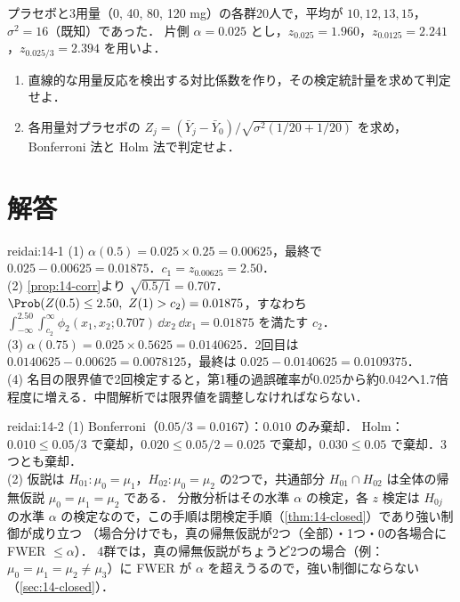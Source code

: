 \begin{reidai}[対比と多重性]\label{reidai:14-3}
プラセボと3用量（0, 40, 80, 120 mg）の各群20人で，平均が $10,12,13,15$，$\sigma^2=16$（既知）であった．
片側 $\alpha=0.025$ とし，$z_{0.025}=1.960$，$z_{0.0125}=2.241$，$z_{0.025/3}=2.394$ を用いよ．
\begin{enumerate}[label=(\arabic*)]
\item 直線的な用量反応を検出する対比係数を作り，その検定統計量を求めて判定せよ．
\item 各用量対プラセボの $Z_j=(\bar Y_j-\bar Y_0)/\sqrt{\sigma^2(1/20+1/20)}$ を求め，Bonferroni 法と Holm 法で判定せよ．
\end{enumerate}
\end{reidai}

\section{解答}\label{sec:14-sol}
\begin{kaitou}{reidai:14-1}
(1) $\alpha(0.5)=0.025\times0.25=0.00625$，最終で $0.025-0.00625=0.01875$．$c_1=z_{0.00625}=2.50$．\\
(2) \cref{prop:14-corr}より $\sqrt{0.5/1}=0.707$．$\Prob(Z(0.5)\le2.50,\ Z(1)>c_2)=0.01875$，すなわち
$\int_{-\infty}^{2.50}\int_{c_2}^{\infty}\phi_2(x_1,x_2;0.707)\,\dd x_2\,\dd x_1=0.01875$ を満たす $c_2$．\\
(3) $\alpha(0.75)=0.025\times0.5625=0.0140625$．2回目は $0.0140625-0.00625=0.0078125$，最終は $0.025-0.0140625=0.0109375$．\\
(4) 名目の限界値で2回検定すると，第1種の過誤確率が0.025から約0.042へ1.7倍程度に増える．中間解析では限界値を調整しなければならない．
\end{kaitou}

\begin{kaitou}{reidai:14-2}
(1) Bonferroni（$0.05/3=0.0167$）：$0.010$ のみ棄却．
Holm：$0.010\le0.05/3$ で棄却，$0.020\le0.05/2=0.025$ で棄却，$0.030\le0.05$ で棄却．3つとも棄却．\\
(2) 仮説は $H_{01}:\mu_0=\mu_1$，$H_{02}:\mu_0=\mu_2$ の2つで，共通部分 $H_{01}\cap H_{02}$ は全体の帰無仮説 $\mu_0=\mu_1=\mu_2$ である．
分散分析はその水準 $\alpha$ の検定，各 $z$ 検定は $H_{0j}$ の水準 $\alpha$ の検定なので，この手順は閉検定手順（\cref{thm:14-closed}）であり強い制御が成り立つ
（場合分けでも，真の帰無仮説が2つ（全部）・1つ・0の各場合に FWER $\le\alpha$）．
4群では，真の帰無仮説がちょうど2つの場合（例：$\mu_0=\mu_1=\mu_2\ne\mu_3$）に FWER が $\alpha$ を超えうるので，強い制御にならない（\cref{sec:14-closed}）．
\end{kaitou}

